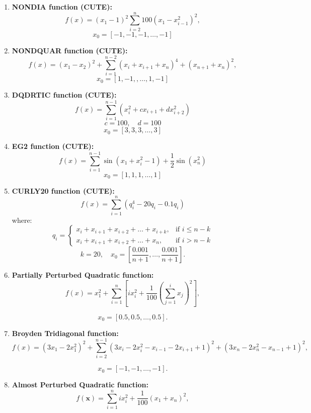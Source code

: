 \documentclass[10pt]{article}
\begin{document}
\begin{enumerate}
    \item \textbf{NONDIA function (CUTE):}
    \[
    f(x) = (x_1 - 1)^2 \sum_{i=2}^{n} 100\left(x_1 -  x_{i-1}^2\right)^2,
    \]
    \[
    x_0 = [-1, -1, -1, \dots, -1]
    \]

    \item \textbf{NONDQUAR function (CUTE):}
    \[
    f(x) = \left(x_1 - x_2\right)^2 + \sum_{i=1}^{n-2} \left( x_i + x_{i+1} + x_n \right)^4 + (x_{n+1} + x_n)^2,
    \]
    \[
    x_0 = [1, -1,, \dots, 1, -1]
    \]

    \item \textbf{DQDRTIC function (CUTE):}
    \[
    f(x) = \sum_{i=1}^{n-1} \left( x_i^2 + c x_{i+1} + d x_{i+2}^2 \right)
    \]
    \[
    c = 100, \quad d = 100
    \]
    \[
    x_0 = [3, 3, 3, \dots, 3]
    \]

    \item \textbf{EG2 function (CUTE):}
    \[
    f(x) = \sum_{i=1}^{n-1} \sin(x_1 + x_i^2 -1) + \frac{1}{2}\sin(x_n^2)
    \]
    \[
    x_0 = [1, 1, 1, \dots, 1]
    \]

    \item \textbf{CURLY20 function (CUTE):}
    \[
    f(x) = \sum_{i=1}^{n} \left( q_i^4 -20q_i - 0.1q_i \right)
    \]
    where:
    \[
    q_i = 
    \begin{cases} 
        x_i + x_{i+1} + x_{i+2} + \dots + x_{i+k}, & \text{if } i \leq n-k \\
        x_i + x_{i+1} + x_{i+2} + \dots + x_n, & \text{if } i > n-k
    \end{cases}
    \]
    \[
    k = 20, \quad x_0 = \left[ \frac{0.001}{n+1}, \ldots, \frac{0.001}{n+1} \right].
    \]

    \item \textbf{Partially Perturbed Quadratic function:}
    \[
    f(x) = x_1^2 + \sum_{i=1}^n \left[ i x_i^2 + \frac{1}{100} \left( \sum_{j=1}^i x_j \right)^2 \right],
    \]
    
    \[
    x_0 = [0.5, 0.5, \ldots, 0.5].
    \]

    \item \textbf{Broyden Tridiagonal function:}
    \[
    f(x) = \left( 3x_1 - 2x_1^2 \right)^2 + \sum_{i=2}^{n-1} \left( 3x_i - 2x_i^2 - x_{i-1} - 2x_{i+1} + 1 \right)^2 + \left( 3x_n - 2x_n^2 - x_{n-1} + 1 \right)^2,
    \]

    \[
    x_0 = [-1, -1, \ldots, -1].
    \]

    \item \textbf{Almost Perturbed Quadratic function:}
    \[
    f(\mathbf{x}) = \sum_{i=1}^{n} i x_i^2 + \frac{1}{100}\left( x_1 + x_n \right)^2,
    \]


\end{enumerate}
\end{document}
